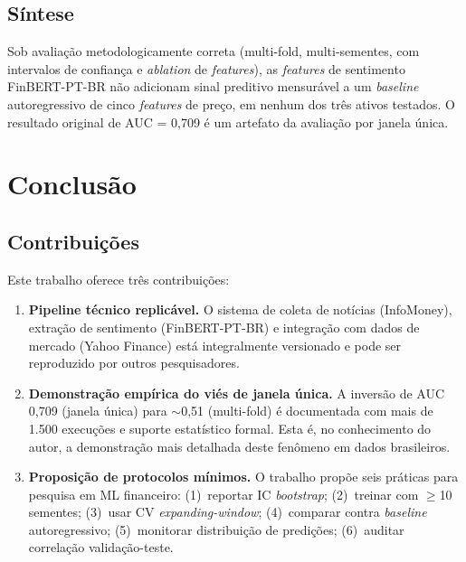 \documentclass[
    12pt,
    openright,
    oneside,
    a4paper,
    english,
    brazil
]{abntex2}
\begin{document}
\section{Síntese}

\begin{citacao}
Sob avaliação metodologicamente correta (multi-fold, multi-sementes, com intervalos de confiança e \textit{ablation} de \textit{features}), as \textit{features} de sentimento FinBERT-PT-BR não adicionam sinal preditivo mensurável a um \textit{baseline} autoregressivo de cinco \textit{features} de preço, em nenhum dos três ativos testados. O resultado original de AUC = 0,709 é um artefato da avaliação por janela única.
\end{citacao}


\chapter{Conclusão}\label{cap:conclusao}

\section{Contribuições}

Este trabalho oferece três contribuições:

\begin{enumerate}
    \item \textbf{Pipeline técnico replicável.} O sistema de coleta de notícias (InfoMoney), extração de sentimento (FinBERT-PT-BR) e integração com dados de mercado (Yahoo Finance) está integralmente versionado e pode ser reproduzido por outros pesquisadores.

    \item \textbf{Demonstração empírica do viés de janela única.} A inversão de AUC 0,709 (janela única) para $\sim$0,51 (multi-fold) é documentada com mais de 1.500 execuções e suporte estatístico formal. Esta é, no conhecimento do autor, a demonstração mais detalhada deste fenômeno em dados brasileiros.

    \item \textbf{Proposição de protocolos mínimos.} O trabalho propõe seis práticas para pesquisa em ML financeiro: (1)~reportar IC \textit{bootstrap}; (2)~treinar com $\geq$10 sementes; (3)~usar CV \textit{expanding-window}; (4)~comparar contra \textit{baseline} autoregressivo; (5)~monitorar distribuição de predições; (6)~auditar correlação validação-teste.
\end{enumerate}
\end{document}
